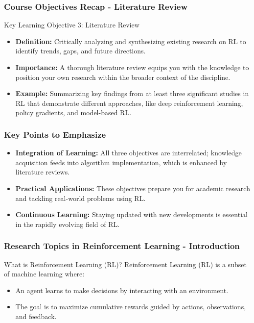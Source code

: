\documentclass[aspectratio=169]{beamer}
\begin{document}
\begin{frame}[fragile]
    \frametitle{Course Objectives Recap - Literature Review}
    \begin{block}{Key Learning Objective 3: Literature Review}
        \begin{itemize}
            \item \textbf{Definition:} Critically analyzing and synthesizing existing research on RL to identify trends, gaps, and future directions.
            \item \textbf{Importance:} A thorough literature review equips you with the knowledge to position your own research within the broader context of the discipline.
            \item \textbf{Example:} Summarizing key findings from at least three significant studies in RL that demonstrate different approaches, like deep reinforcement learning, policy gradients, and model-based RL.
        \end{itemize}
    \end{block}
\end{frame}

\begin{frame}[fragile]
    \frametitle{Key Points to Emphasize}
    \begin{itemize}
        \item \textbf{Integration of Learning:} All three objectives are interrelated; knowledge acquisition feeds into algorithm implementation, which is enhanced by literature reviews.
        \item \textbf{Practical Applications:} These objectives prepare you for academic research and tackling real-world problems using RL.
        \item \textbf{Continuous Learning:} Staying updated with new developments is essential in the rapidly evolving field of RL.
    \end{itemize}
\end{frame}

\begin{frame}[fragile]
    \frametitle{Research Topics in Reinforcement Learning - Introduction}
    \begin{block}{What is Reinforcement Learning (RL)?}
        Reinforcement Learning (RL) is a subset of machine learning where:
        \begin{itemize}
            \item An agent learns to make decisions by interacting with an environment.
            \item The goal is to maximize cumulative rewards guided by actions, observations, and feedback.
        \end{itemize}
    \end{block}
\end{frame}
\end{document}
